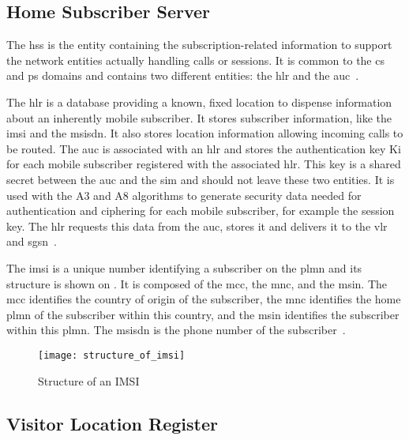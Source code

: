     \subsection{Home Subscriber Server}

      The \gls{hss} is the entity containing the subscription-related
      information to support the network entities actually handling
      calls or sessions. It is common to the \gls{cs} and \gls{ps}
      domains and contains two different entities: the \gls{hlr} and the
      \gls{auc}~\cite{3gpp_ts_2015}.

      The \gls{hlr} is a database providing a known, fixed location to
      dispense information about an inherently mobile subscriber. It
      stores subscriber information, like the \gls{imsi} and the
      \gls{msisdn}. It also stores location information allowing
      incoming calls to be routed. The \gls{auc} is associated with an
      \gls{hlr} and stores the authentication key Ki for each mobile
      subscriber registered with the associated \gls{hlr}. This key is a
      shared secret between the \gls{auc} and the \gls{sim} and should
      not leave these two entities. It is used with the A3 and A8
      algorithms to generate security data needed for authentication and
      ciphering for each mobile subscriber, for example the session key.
      The \gls{hlr} requests this data from the \gls{auc}, stores it and
      delivers it to the \gls{vlr} and
      \gls{sgsn}~\cite{etsi_gsm_1992,etsi_gsm_2001,3gpp_ts_2015}.

      The \gls{imsi} is a unique number identifying a subscriber on the
      \gls{plmn} and its structure is shown on
      . It is composed of the \gls{mcc}, the
      \gls{mnc}, and the \gls{msin}. The \gls{mcc} identifies the
      country of origin of the subscriber, the \gls{mnc} identifies the
      home \gls{plmn} of the subscriber within this country, and the
      \gls{msin} identifies the subscriber within this \gls{plmn}. The
      \gls{msisdn} is the phone number of the
      subscriber~\cite{3gpp_ts_2003}.

      \begin{figure}[h]
        \centering
        \texttt{[image: structure\_of\_imsi]}
        \caption{Structure of an IMSI~\cite{3gpp_ts_2003}}
        \label{fig:structure_of_imsi}
      \end{figure}

    \subsection{Visitor Location Register}

